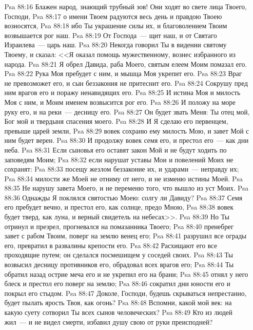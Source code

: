 \vs Psa 88:16 Блажен народ, знающий трубный зов! Они ходят во свете лица Твоего, Господи,
\vs Psa 88:17 о имени Твоем радуются весь день и правдою Твоею возносятся,
\vs Psa 88:18 ибо Ты украшение силы их, и благоволением Твоим возвышается рог наш.
\vs Psa 88:19 От Господа~--- щит наш, и от Святаго Израилева~--- царь наш.
\vs Psa 88:20 Некогда говорил Ты в видении святому Твоему, и сказал: <<Я оказал помощь мужественному, вознес избранного из народа.
\vs Psa 88:21 Я обрел Давида, раба Моего, святым елеем Моим помазал его.
\vs Psa 88:22 Рука Моя пребудет с ним, и мышца Моя укрепит его.
\vs Psa 88:23 Враг не превозможет его, и сын беззакония не притеснит его.
\vs Psa 88:24 Сокрушу пред ним врагов его и поражу ненавидящих его.
\vs Psa 88:25 И истина Моя и милость Моя с ним, и Моим именем возвысится рог его.
\vs Psa 88:26 И положу на море руку его, и на реки~--- десницу его.
\vs Psa 88:27 Он будет звать Меня: Ты отец мой, Бог мой и твердыня спасения моего.
\vs Psa 88:28 И Я сделаю его первенцем, превыше царей земли,
\vs Psa 88:29 вовек сохраню ему милость Мою, и завет Мой с ним будет верен.
\vs Psa 88:30 И продолжу вовек семя его, и престол его~--- как дни неба.
\vs Psa 88:31 Если сыновья его оставят закон Мой и не будут ходить по заповедям Моим;
\vs Psa 88:32 если нарушат уставы Мои и повелений Моих не сохранят:
\vs Psa 88:33 посещу жезлом беззаконие их, и ударами~--- неправду их;
\vs Psa 88:34 милости же Моей не отниму от него, и не изменю истины Моей.
\vs Psa 88:35 Не нарушу завета Моего, и не переменю того, что вышло из уст Моих.
\vs Psa 88:36 Однажды Я поклялся святостью Моею: солгу ли Давиду?
\vs Psa 88:37 Семя его пребудет вечно, и престол его, как солнце, предо Мною,
\vs Psa 88:38 вовек будет тверд, как луна, и верный свидетель на небесах>>.
\vs Psa 88:39 Но  Ты отринул и презрел, прогневался на помазанника Твоего;
\vs Psa 88:40 пренебрег завет с рабом Твоим, поверг на землю венец его;
\vs Psa 88:41 разрушил все ограды его, превратил в развалины крепости его.
\vs Psa 88:42 Расхищают его все проходящие путем; он сделался посмешищем у соседей своих.
\vs Psa 88:43 Ты возвысил десницу противников его, обрадовал всех врагов его;
\vs Psa 88:44 Ты обратил назад острие меча его и не укрепил его на брани;
\vs Psa 88:45 отнял у него блеск и престол его поверг на землю;
\vs Psa 88:46 сократил дни юности его и покрыл его стыдом.
\vs Psa 88:47 Доколе, Господи, будешь скрываться непрестанно, будет пылать ярость Твоя, как огонь?
\vs Psa 88:48 Вспомни, какой мой век: на какую суету сотворил Ты всех сынов человеческих?
\vs Psa 88:49 Кто из людей жил~--- и не видел смерти, избавил душу свою от руки преисподней?
